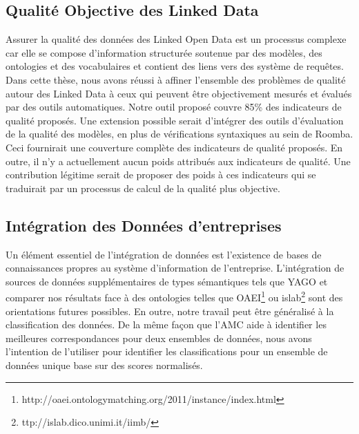 \subsection{Qualit\'{e} Objective des Linked Data}
Assurer la qualit\'{e} des donn\'{e}es des Linked Open Data est un processus complexe car elle se compose d'information structur\'{e}e soutenue par des mod\`{e}les, des ontologies et des vocabulaires et contient des liens vers des syst\`{e}me de requ\^{e}tes. Dans cette th\`{e}se, nous avons r\'{e}ussi \`{a} affiner l'ensemble des probl\`{e}mes de qualit\'{e} autour des Linked Data \`{a} ceux qui peuvent \^{e}tre objectivement mesur\'{e}s et \'{e}valu\'{e}s par des outils automatiques. Notre outil propos\'{e} couvre 85\% des indicateurs de qualit\'{e} propos\'{e}s. Une extension possible serait d'int\'{e}grer des outils d'\'{e}valuation de la qualit\'{e} des mod\`{e}les, en plus de v\'{e}rifications syntaxiques au sein de Roomba. Ceci fournirait une couverture compl\`{e}te des indicateurs de qualit\'{e} propos\'{e}s. En outre, il n'y a actuellement aucun poids attribu\'{e}s aux indicateurs de qualit\'{e}. Une contribution l\'{e}gitime serait de proposer des poids \`{a} ces indicateurs qui se traduirait par un processus de calcul de la qualit\'{e} plus objective.

\subsection{Int\'{e}gration des Donn\'{e}es d'entreprises}
Un \'{e}l\'{e}ment essentiel de l'int\'{e}gration de donn\'{e}es est l'existence de bases de connaissances propres au syst\`{e}me d'information de l'entreprise. L'int\'{e}gration de sources de donn\'{e}es suppl\'{e}mentaires de types s\'{e}mantiques tels que YAGO et comparer nos r\'{e}sultats face \`{a} des ontologies telles que OAEI\footnote{http://oaei.ontologymatching.org/2011/instance/index.html} ou islab\footnote{ttp://islab.dico.unimi.it/iimb/} sont des orientations futures possibles. En outre, notre travail peut \^{e}tre g\'{e}n\'{e}ralis\'{e} \`{a} la classification des donn\'{e}es. De la m\^{e}me façon que l'AMC aide \`{a} identifier les meilleures correspondances pour deux ensembles de donn\'{e}es, nous avons l'intention de l'utiliser pour identifier les classifications pour un ensemble de donn\'{e}es unique base sur des scores normalis\'{e}s. 